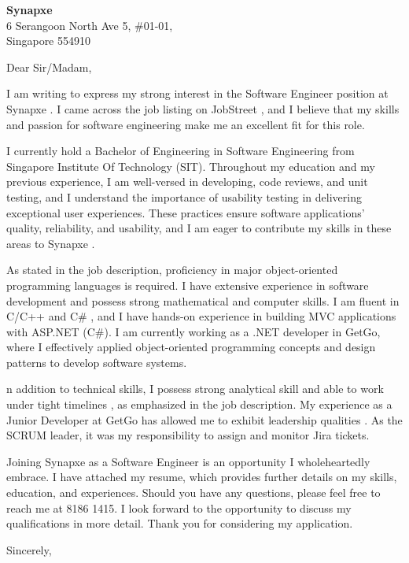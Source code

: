 \documentclass[a4paper, 11pt]{letter}
\newcommand{\companyname}{ Synapxe }
\newcommand{\joblistingon}{ JobStreet }
\newcommand{\programing}{ C/C++ and C\# }
\newcommand{\role}{ Software Engineer }
\newcommand{\softskill}{ possess strong analytical skill and able to work under tight timelines }
\begin{document}
\begin{letter}
{   %
\textbf{Synapxe} \\
6 Serangoon North Ave 5, \#01-01,\\
Singapore 554910 \\
}

\makecovertitle

\contact

\opening{Dear Sir/Madam,}

I am writing to express my strong interest in the \role position at  \companyname. I came across the job listing on \joblistingon, and I believe that my skills and passion for software engineering make me an excellent fit for this role. 

I currently hold a Bachelor of Engineering in Software Engineering from Singapore Institute Of Technology (SIT). Throughout my education and my previous experience, I am well-versed in developing, code reviews, and unit testing, and I understand the importance of usability testing in delivering exceptional user experiences. These practices ensure software applications' quality, reliability, and usability, and I am eager to contribute my skills in these areas to \companyname. 

As stated in the job description, proficiency in major object-oriented programming languages is required. I have extensive experience in software development and possess strong mathematical and computer skills. I am fluent in \programing, and I have hands-on experience in building MVC applications with ASP.NET (C\#). I am currently working as a .NET developer in GetGo, where I effectively applied object-oriented programming concepts and design patterns to develop software systems.

n addition to technical skills, I \softskill, as emphasized in the job description. My experience as a Junior Developer at GetGo has allowed me to exhibit leadership qualities . As the SCRUM leader, it was my responsibility to assign and monitor Jira tickets. 

Joining \companyname as a \role is an opportunity I wholeheartedly embrace. I have attached my resume, which provides further details on my skills, education, and experiences. Should you have any questions, please feel free to reach me at 8186 1415. I look forward to the opportunity to discuss my qualifications in more detail. Thank you for considering my application.


\closing{Sincerely,}
\end{letter}
\end{document}
